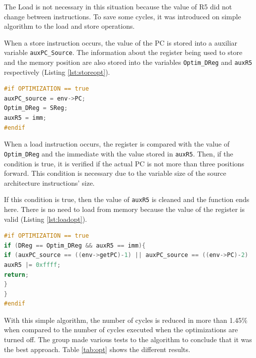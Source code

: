 \par The Load is not necessary in this situation because the value of R5 did not change between instructions. To save some cycles, it was introduced on simple algorithm to the load and store operations.
\par When a store instruction occurs, the value of the PC is stored into a auxiliar variable \texttt{auxPC\_Source}. The information about the register being used to store and the memory position are also stored into the variables \texttt{Optim\_DReg} and \texttt{auxR5} respectively (Listing \ref{lst:storeopt}). 

\begin{lstlisting}[language=C++,caption=Store function optimization code.,label=lst:storeopt]
#if OPTIMIZATION == true
auxPC_source = env->PC;
Optim_DReg = SReg;
auxR5 = imm; 
#endif
\end{lstlisting}
\par When a load instruction occurs, the register is compared with the value of \texttt{Optim\_DReg} and the immediate with the value stored in \texttt{auxR5}. Then, if the condition is true, it is verified if the actual PC is not more than three positions forward. This condition is necessary due to the variable size of the source architecture instructions' size. 
\par If this condition is true, then the value of \texttt{auxR5} is cleaned and the function ends here. There is no need to load from memory because the value of the register is valid (Listing \ref{lst:loadopt}). 

\begin{lstlisting}[language=C++,caption=Load function optimization code.,label=lst:loadopt]
#if OPTIMIZATION == true
if (DReg == Optim_DReg && auxR5 == imm){
if (auxPC_source == ((env->getPC)-1) || auxPC_source == ((env->PC)-2) || auxPC_source == ((env->PC)-3)){
auxR5 |= 0xffff;
return;
}
}
#endif 
\end{lstlisting}

\par With this simple algorithm, the number of cycles is reduced in more than 1.45\% when compared to the number of cycles executed when the optimizations are turned off. The group made various tests to the algorithm to conclude that it was the best approach. Table \ref{tab:opt} shows the different results.

